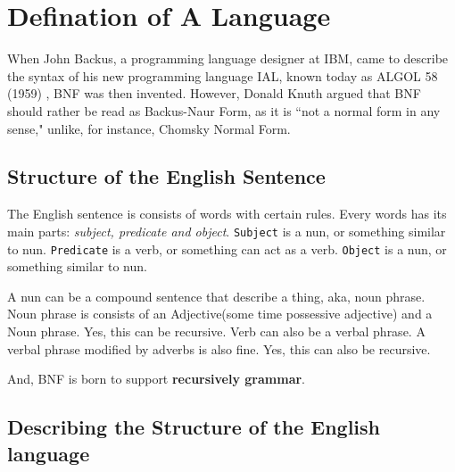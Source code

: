 \section{Defination of A Language}
When John Backus, a programming language designer at IBM, came to describe the syntax of his new programming language IAL, known today as ALGOL 58 (1959)\cite{BNF_ALGOL} , BNF was then invented.
However, Donald Knuth argued that BNF should rather be read as Backus-Naur Form, as it is ``not a normal form in any sense,\cite{BNFvsBNF}" unlike, for instance, Chomsky Normal Form.

\subsection{Structure of the English Sentence}
The English sentence is consists of words with certain rules. Every words has its main parts: \emph{subject, predicate and object}.
{\tt Subject} is a nun, or something similar to nun. 
{\tt Predicate} is a verb, or something can act as a verb.
{\tt Object} is a nun, or something similar to nun. 

A nun can be a compound sentence that describe a thing, aka, noun phrase.
Noun phrase is consists of an Adjective(some time possessive adjective) and a Noun phrase. Yes, this can be recursive. 
Verb can also be a verbal phrase. A verbal phrase modified by adverbs is also fine. Yes, this can also be recursive. 

And, BNF is born to support {\bf recursively grammar}.


\subsection{Describing the Structure of the English language}

